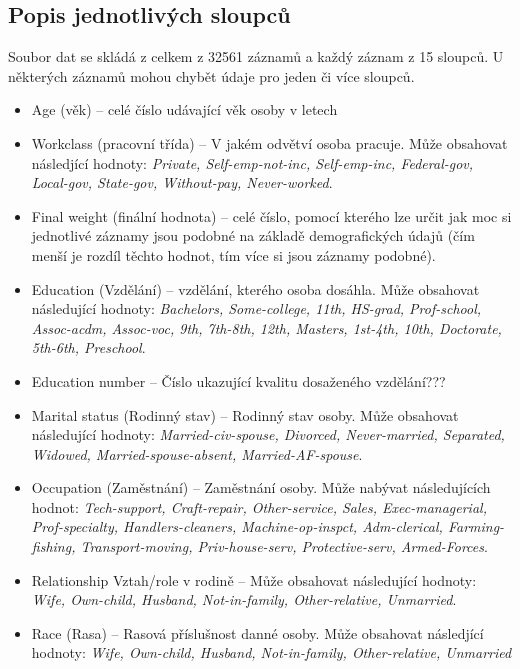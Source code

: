 \documentclass[11pt,a4paper,titlepage]{article}
\begin{document}
        \subsection{Popis jednotlivých sloupců}
            Soubor dat se skládá z celkem z 32561 záznamů a každý záznam z 15 sloupců. U některých záznamů mohou chybět údaje pro jeden či více sloupců.
            \begin{itemize}
                \item Age (věk) -- celé číslo udávající věk osoby v letech
                \item Workclass (pracovní třída) -- V jakém odvětví osoba pracuje. Může obsahovat následjící hodnoty: \textit{Private, Self-emp-not-inc, Self-emp-inc, Federal-gov, Local-gov, State-gov, Without-pay, Never-worked}.
                \item Final weight (finální hodnota) -- celé číslo, pomocí kterého lze určit jak moc si jednotlivé záznamy jsou podobné na základě demografických údajů (čím menší je rozdíl těchto hodnot, tím více si jsou záznamy podobné).
                \item Education (Vzdělání) -- vzdělání, kterého osoba dosáhla. Může obsahovat následující hodnoty: \textit{Bachelors, Some-college, 11th, HS-grad, Prof-school, Assoc-acdm, Assoc-voc, 9th, 7th-8th, 12th, Masters, 1st-4th, 10th, Doctorate, 5th-6th, Preschool}.
                \item Education number -- Číslo ukazující kvalitu dosaženého vzdělání???
                \item Marital status (Rodinný stav) -- Rodinný stav osoby. Může obsahovat následující hodnoty: \textit{Married-civ-spouse, Divorced, Never-married, Separated, Widowed, Married-spouse-absent, Married-AF-spouse}.
                \item Occupation (Zaměstnání) -- Zaměstnání osoby. Může nabývat následujících hodnot: \textit{Tech-support, Craft-repair, Other-service, Sales, Exec-managerial, Prof-specialty, Handlers-cleaners, Machine-op-inspct, Adm-clerical, Farming-fishing, Transport-moving, Priv-house-serv, Protective-serv, Armed-Forces}.
                \item Relationship Vztah/role v rodině -- Může obsahovat následující hodnoty: \textit{Wife, Own-child, Husband, Not-in-family, Other-relative, Unmarried}.
                \item Race (Rasa) -- Rasová příslušnost danné osoby. Může obsahovat následjící hodnoty: \textit{Wife, Own-child, Husband, Not-in-family, Other-relative, Unmarried}

\end{itemize}
\end{document}
